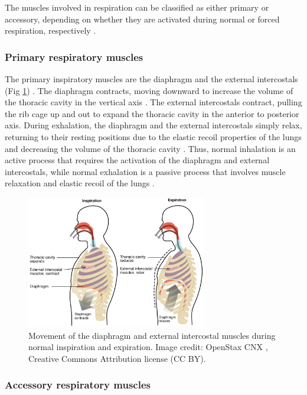 \documentclass[12pt]{article}
\begin{document}
The muscles involved in respiration can be classified as either primary or accessory, depending on whether they are activated during normal or forced respiration, respectively \cite{sieck2013mechanical}. 

\subsubsection*{Primary respiratory muscles}

The primary inspiratory muscles are the diaphragm and the external intercostals (Fig \ref{fig:primary}) \cite{openStax2016resp}. The diaphragm contracts, moving downward to increase the volume of the thoracic cavity in the vertical axis \cite{guyton20006textbook}. The external intercostals contract, pulling the rib cage up and out to expand the thoracic cavity in the anterior to posterior axis. During exhalation, the diaphragm and the external intercostals simply relax, returning to their resting positions due to the elastic recoil properties of the lungs and decreasing the volume of the thoracic cavity \cite{guyton20006textbook}. Thus, normal inhalation is an active process that requires the activation of the diaphragm and external intercostals, while normal exhalation is a passive process that involves muscle relaxation and elastic recoil of the lungs \cite{openStax2016resp}.

\begin{figure}[h!]
\centering
\includegraphics[width=0.7\textwidth]{images/Inspiration_and_Expiration.jpg}
\caption{Movement of the diaphragm and external intercostal muscles during normal inspiration and expiration. Image credit: OpenStax CNX \cite{openStax2016resp}, Creative Commons Attribution license (CC BY).}
\label{fig:primary}
\end{figure}

\subsubsection*{Accessory respiratory muscles}
\end{document}
